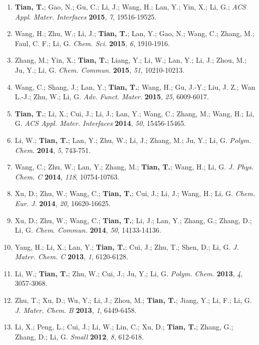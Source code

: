\documentclass[margin]{res}
\begin{document}
\begin{resume}
\begin{enumerate}
    \item \textbf{Tian, T.}; Gao, N.; Gu, C.; Li, J.; Wang, H.; Lan, Y.;
    Yin, X.; Li, G.; \textit{ACS Appl. Mater. Interfaces}
    \textbf{2015}, \textit{7}, 19516-19525.
  \item Wang, H.; Zhu, W.; Li, J.; \textbf{Tian, T.}; Lan, Y.; Gao,
    N.; Wang, C.; Zhang, M.; Faul, C. F.; Li, G. \textit{Chem. Sci.}
    \textbf{2015}, \textit{6}, 1910-1916.
  \item Zhang, M.; Yin, X.; \textbf{Tian, T.}; Liang, Y.; Li, W.; Lan,
    Y.; Li, J.; Zhou, M.; Ju, Y.; Li, G. \textit{Chem. Commun.}
    \textbf{2015}, \textit{51}, 10210-10213.
  \item Wang, C.; Shang, J.; Lan, Y.; \textbf{Tian, T.}; Wang, H.; Gu,
    J.-Y.; Liu, J. Z.; Wan L.-J.; Zhu, W.; Li,
    G. \textit{Adv. Funct. Mater.} \textbf{2015}, \textit{25},
    6009-6017.
    \item \textbf{Tian, T.}; Li, X.; Cui, J.; Li, J.; Lan, Y.; Wang, C.;
    Zhang, M.; Wang, H.; Li, G. \textit{ACS Appl. Mater. Interfaces}
    \textbf{2014}, \textit{50}, 15456-15465.
  \item Li, W.; \textbf{Tian, T.}; Lan, Y.; Zhu, W.; Li, J.; Zhang,
    M.; Ju, Y.; Li, G. \textit{Polym. Chem.} \textbf{2014},
    \textit{5}, 743-751.
  \item Wang, C.; Zhu, W.; Lan, Y.; Zhang, M.; \textbf{Tian, T.};
    Wang, H.; Li, G. \textit{J. Phys. Chem. C} \textbf{2014},
    \textit{118}, 10754-10763.
  \item Xu, D.; Zhu, W.; Wang, C.; \textbf{Tian, T.}; Cui, J.; Li, J.;
    Wang, H.; Li, G. \textit{Chem. Eur. J.} \textbf{2014},
    \textit{20}, 16620-16625.
  \item Xu, D.; Zhu, W.; Wang, C.; \textbf{Tian, T.}; Li, J.; Lan, Y.;
    Zhang, G.; Zhang, D.; Li, G. \textit{Chem. Commun.} \textbf{2014},
    \textit{50}, 14133-14136.
  \item Yang, H.; Li, X.; Lan, Y.; \textbf{Tian, T.}; Cui, J.; Zhu,
    T.; Shen, D.; Li, G. \textit{J. Mater. Chem. C} \textbf{2013},
    \textit{1}, 6120-6128.
  \item Li, W.; \textbf{Tian, T.}; Zhu, W.; Cui, J.; Ju, Y.; Li,
    G. \textit{Polym. Chem.} \textbf{2013}, \textit{4}, 3057-3068.
  \item Zhu, T.; Xu, D.; Wu, Y.; Li, J.; Zhou, M.; \textbf{Tian, T.};
    Jiang, Y.; Li, F.; Li, G. \textit{J. Mater. Chem. B}
    \textbf{2013}, \textit{1}, 6449-6458.
  \item Li, X.; Peng, L.; Cui, J.; Li, W.; Lin, C.; Xu, D.;
    \textbf{Tian, T.}; Zhang, G.; Zhang, D.; Li, G. \textit{Small}
    \textbf{2012}, \textit{8}, 612-618.


\end{enumerate}



\end{resume}
\end{document}
